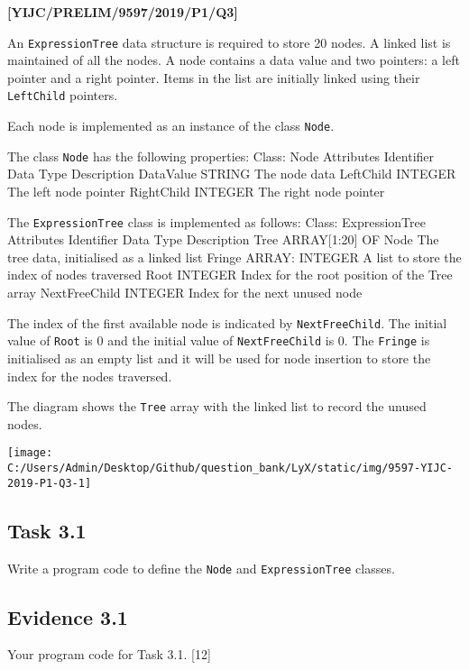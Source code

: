 \item \textbf{{[}YIJC/PRELIM/9597/2019/P1/Q3{]} }

An \texttt{ExpressionTree} data structure is required to store 20
nodes. A linked list is maintained of all the nodes. A node contains
a data value and two pointers: a left pointer and a right pointer.
Items in the list are initially linked using their \texttt{LeftChild}
pointers. 

Each node is implemented as an instance of the class \texttt{Node}. 

The class \texttt{Node} has the following properties: Class: Node
Attributes Identifier Data Type Description DataValue STRING The node
data LeftChild INTEGER The left node pointer RightChild INTEGER The
right node pointer 

The \texttt{ExpressionTree} class is implemented as follows: Class:
ExpressionTree Attributes Identifier Data Type Description Tree ARRAY{[}1:20{]}
OF Node The tree data, initialised as a linked list Fringe ARRAY:
INTEGER A list to store the index of nodes traversed Root INTEGER
Index for the root position of the Tree array NextFreeChild INTEGER
Index for the next unused node 

The index of the first available node is indicated by \texttt{NextFreeChild}.
The initial value of \texttt{Root} is 0 and the initial value of \texttt{NextFreeChild}
is 0. The \texttt{Fringe} is initialised as an empty list and it will
be used for node insertion to store the index for the nodes traversed. 

The diagram shows the \texttt{Tree} array with the linked list to
record the unused nodes.
\begin{center}
\texttt{[image: C:/Users/Admin/Desktop/Github/question\_bank/LyX/static/img/9597-YIJC-2019-P1-Q3-1]}
\par\end{center}

\subsection*{Task 3.1 }

Write a program code to define the \texttt{Node} and \texttt{ExpressionTree}
classes.

\subsection*{Evidence 3.1}

Your program code for Task 3.1. \hfill{}{[}12{]}


